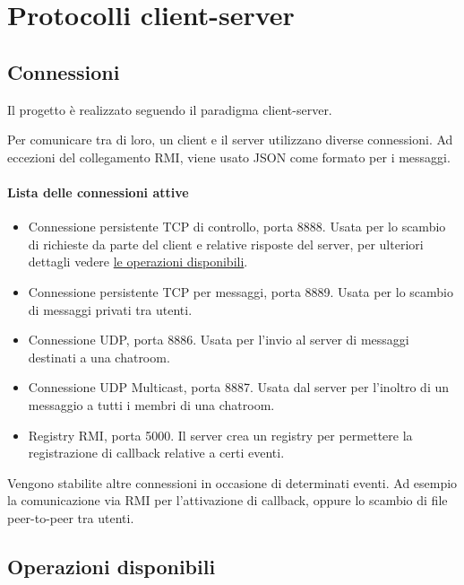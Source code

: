 \section{Protocolli client-server}

\subsection{Connessioni}

Il progetto è realizzato seguendo il paradigma client-server.

Per comunicare tra di loro, un client e il server utilizzano diverse connessioni. Ad eccezioni del collegamento RMI, viene usato JSON come formato per i messaggi.

\paragraph{Lista delle connessioni attive}
\begin{itemize}

    \item Connessione persistente TCP di controllo, porta 8888. Usata per lo scambio di richieste da parte del client e relative risposte del server, per ulteriori dettagli vedere \hyperref[ssec:operazioni]{le operazioni disponibili}.

    \item Connessione persistente TCP per messaggi, porta 8889. Usata per lo scambio di messaggi privati tra utenti.

    \item Connessione UDP, porta 8886. Usata per l'invio al server di messaggi destinati a una chatroom.

    \item Connessione UDP Multicast, porta 8887. Usata dal server per l'inoltro di un messaggio a tutti i membri di una chatroom.

    \item Registry RMI, porta 5000. Il server crea un registry per permettere la registrazione di callback relative a certi eventi.

\end{itemize}
    
Vengono stabilite altre connessioni in occasione di determinati eventi. Ad esempio la comunicazione via RMI per l'attivazione di callback, oppure lo scambio di file peer-to-peer tra utenti.
    
\subsection{Operazioni disponibili}
\label{ssec:operazioni}
